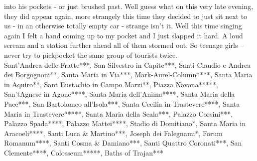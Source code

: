 into his pockets - or just brushed past. Well guess what on this very late evening, they did appear again, more strangely this time they decided to just sit next to us - in an otherwise totally empty car - strange isn't it. Well this time singing again I felt a hand coming up to my pocket and I just slapped it hard. A loud scream and a station further ahead all of them stormed out. So teenage girls -- never try to pickpocket the same group of tourists twice.\\

Sant'Andrea delle Fratte***,  San Silvestro in Capite***,  Santi Claudio e Andrea dei Borgognoni**,  Santa Maria in Via***,  Mark-Aurel-Column****,  Santa Maria in Aquiro**,  Sant Eustachio in Campo Marzi**,  Piazza Navona*****,  San'tAgnese in Agone****,  Santa Maria dell'Anima****,  Santa Maria della Pace***,  San Bartolomeo all'Isola***,  Santa Cecilia in Trastevere****,  Santa Maria in Trastevere*****,  Santa Maria della Scala***,  Palazzo Corsini***,  Palazzo Spada****,  Palazzo Mattei****,  Stadio di Domitiano*,  Santa Maria in Aracoeli****,  Santi Luca \& Martino***,  Joseph dei Falegnami*,  Forum Romanum****,  Santi Cosma \& Damiano***,  Santi Quattro Coronati***,  San Clemente****,  Colosseum*****,  Baths of Trajan***\\

